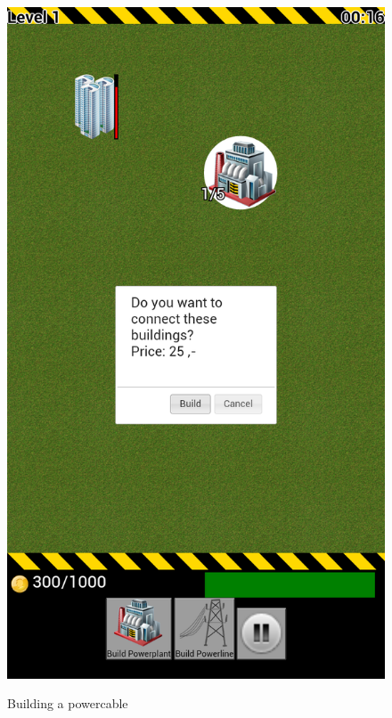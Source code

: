 \begin{figure}[H]
{		\includegraphics[scale=0.18]{pictures/sprint4-screen/buildpowercable2}
	}
	\caption{Building a powercable}
\end{figure}

